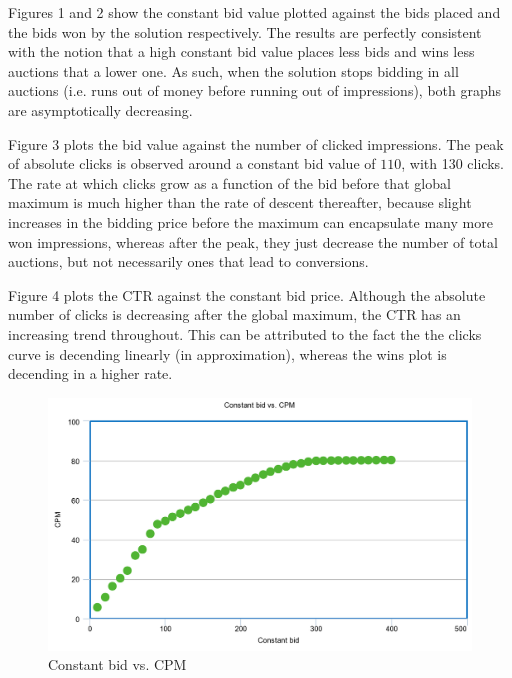 \documentclass{sig-alternate-05-2015}
\begin{document}
Figures 1 and 2 show the constant bid value plotted against the bids placed and the bids won by the solution respectively. The results are perfectly consistent with the notion that a high constant bid value places less bids and wins less auctions that a lower one. As such, when the solution stops bidding in all auctions (i.e. runs out of money before running out of impressions), both graphs are asymptotically decreasing.

Figure 3 plots the bid value against the number of clicked impressions. The peak of absolute clicks is observed around a constant bid value of $110$, with 130 clicks. The rate at which clicks grow as a function of the bid before that global maximum is much higher than the rate of descent thereafter, because slight increases in the bidding price before the maximum can encapsulate many more won impressions, whereas after the peak, they just decrease the number of total auctions, but not necessarily ones that lead to conversions. 

Figure 4 plots the CTR against the constant bid price. Although the absolute number of clicks is decreasing after the global maximum, the CTR has an increasing trend throughout. This can be attributed to the fact the the clicks curve is decending linearly (in approximation), whereas the wins plot is decending in a higher rate.

\begin{figure}
  \includegraphics[width=\linewidth]{constant_cpm.png}
  \caption{Constant bid vs. CPM}
  \label{fig:CPM}
\end{figure}
\end{document}
